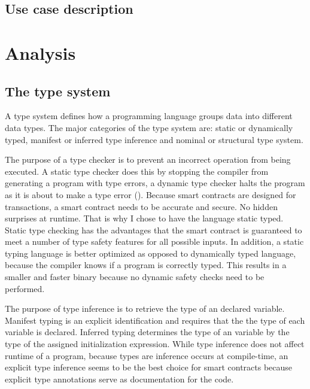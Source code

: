 \documentclass{uva-inf-article}
\begin{document}
\subsection{Use case description}
\newpage

\section{Analysis}
\subsection{The type system}
\par A type system defines how a programming language groups data into different data types.
The major categories of the type system are: static or dynamically typed, manifest or inferred 
type inference and nominal or structural type system.
\vspace{5mm}

\par The purpose of a type checker is to prevent an incorrect operation from being executed.
A static type checker does this by stopping the compiler from generating a program with type errors, 
a dynamic type checker halts the program as it is about to make a type error (\cite{matthews1987static}).
Because smart contracts are designed for transactions, a smart contract needs to be accurate and secure. 
No hidden surprises at runtime.
That is why I chose to have the language static typed.
Static type checking has the advantages that the smart contract is guaranteed to meet a number of type safety features for all possible inputs.
In addition, a static typing language is better optimized as opposed to dynamically typed language, because the compiler knows if a program is correctly typed.
This results in a smaller and faster binary because no dynamic safety checks need to be performed.
\vspace{5mm}

\par The purpose of type inference is to retrieve the type of an declared variable.
Manifest typing is an explicit identification and requires that the the type of each variable is declared.
Inferred typing determines the type of an variable by the type of the assigned initialization expression.
While type inference does not affect runtime of a program, because types are inference occurs at compile-time,
an explicit type inference seems to be the best choice for smart contracts because  
explicit type annotations serve as documentation for the code.
\vspace{5mm}
\end{document}
